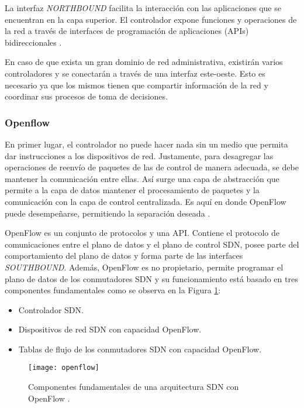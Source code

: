 La interfaz \textit{NORTHBOUND} facilita la interacción con las aplicaciones que
se encuentran en la capa superior. El controlador expone funciones y operaciones
de la red a través de interfaces de programación de aplicaciones (APIs)
bidireccionales \parencite{sdn_oreilly}.

En caso de que exista un gran dominio de red administrativa, existirán varios
controladores y se conectarán a través de una interfaz este-oeste. Esto es
necesario ya que los mismos tienen que compartir información de la red y
coordinar sus procesos de toma de decisiones.

\subsubsection*{Openflow}\label{sec:opflow}

En primer lugar, el controlador no puede hacer nada sin un medio que permita dar
instrucciones a los dispositivos de red. Justamente, para desagregar las
operaciones de reenvío de paquetes de las de control de manera adecuada, se debe
mantener la comunicación entre ellas. Así surge una capa de abstracción que
permite a la capa de datos mantener el procesamiento de paquetes y la
comunicación con la capa de control centralizada. Es aquí en donde OpenFlow
puede desempeñarse, permitiendo la separación deseada \parencite{sdn_approach}.

OpenFlow es un conjunto de protocolos y una API. Contiene el protocolo de
comunicaciones entre el plano de datos y el plano de control SDN, posee parte
del comportamiento del plano de datos y forma parte de las interfaces
\textit{SOUTHBOUND}. Además, OpenFlow es no propietario, permite programar el
plano de datos de los conmutadores SDN y su funcionamiento está basado en tres
componentes fundamentales como se observa en la Figura \ref{fig:openflow_1}:

\begin{itemize}
\item Controlador SDN.
\item Dispositivos de red SDN con capacidad OpenFlow.
\item Tablas de flujo de los conmutadores SDN con capacidad OpenFlow.
\end{itemize}


\begin{figure}[H]
	\centering 
	\texttt{[image: openflow]}
	\caption[Componentes fundamentales de una arquitectura SDN con OpenFlow]{Componentes fundamentales de una arquitectura SDN con OpenFlow
    \parencite{sdn_approach}.}
	\label{fig:openflow_1}
\end{figure}


